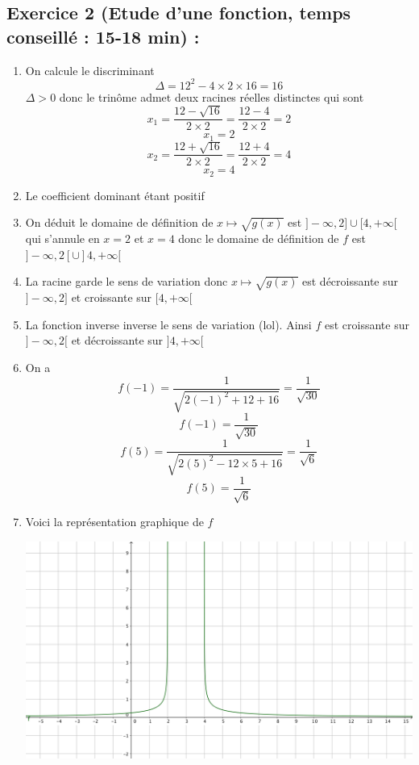 \subsection*{Exercice 2 (Etude d'une fonction, temps conseillé : 15-18 min) : }
\begin{enumerate}
\item On calcule le discriminant 
$$\Delta = 12^2-4\times2\times16 = 16$$
$\Delta > 0$ donc le trinôme admet deux racines réelles distinctes qui sont 
$$x_1 = \frac{12 - \sqrt{16}}{2\times2} = \frac{12 - 4}{2\times2} = 2$$
$$\boxed{x_1 = 2}$$
$$x_2 = \frac{12 + \sqrt{16}}{2\times2} = \frac{12 + 4}{2\times2} = 4$$
$$\boxed{x_2 = 4}$$
\item Le coefficient dominant étant positif
\item On déduit le domaine de définition de $x\mapsto \sqrt{g(x)}$ est $]-\infty,2] \cup [4,+\infty[$ qui s'annule en $x=2$ et $x=4$ donc le domaine de définition de $f$ est $]-\infty,2[ \cup ]4,+\infty[$
\item La racine garde le sens de variation donc $x\mapsto \sqrt{g(x)}$ est décroissante sur $]-\infty,2]$ et croissante sur $[4,+\infty[$
\item La fonction inverse inverse le sens de variation (lol). Ainsi $f$ est croissante sur $]-\infty,2[$ et décroissante sur $]4,+\infty[$
\item On a
$$f(-1) = \frac{1}{\sqrt{2(-1)^2 +12+16}} = \frac{1}{\sqrt{30}}$$
$$\boxed{f(-1) = \frac{1}{\sqrt{30}}}$$
$$f(5) = \frac{1}{\sqrt{2(5)^2 -12\times 5+16}} = \frac{1}{\sqrt{6}}$$
$$\boxed{f(5) = \frac{1}{\sqrt{6}}}$$
\item Voici la représentation graphique de $f$ \newline

\center
\includegraphics[scale=0.7]{chap2_corr_ill1.png}
\flushleft
\end{enumerate}
